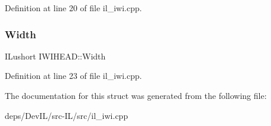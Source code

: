 Definition at line 20 of file il\+\_\+iwi.\+cpp.

\mbox{\label{structIWIHEAD_a004e447c9d90565453841108a61e3732}} 
\subsubsection{\texorpdfstring{Width}{Width}}
{\footnotesize\ttfamily I\+Lushort I\+W\+I\+H\+E\+A\+D\+::\+Width}



Definition at line 23 of file il\+\_\+iwi.\+cpp.



The documentation for this struct was generated from the following file\+:\begin{DoxyCompactItemize}
\item 
deps/\+Dev\+I\+L/src-\/\+I\+L/src/il\+\_\+iwi.\+cpp\end{DoxyCompactItemize}
